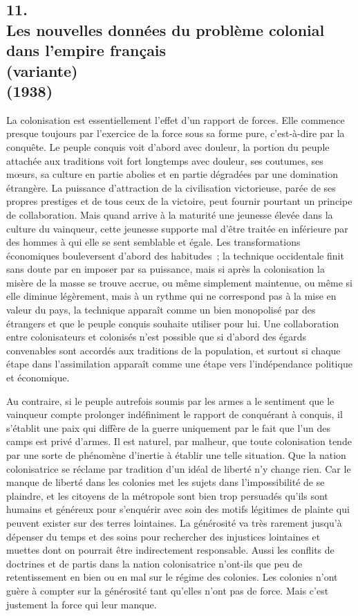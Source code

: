\documentclass[french,twoside]{book} %
\begin{document}
\subsection[11. Les nouvelles données du problème colonial dans l'empire français, (variante) (1938)]{11. \\
Les nouvelles données du problème colonial dans l'empire français \\
(variante) \\
(1938)}
\noindent \par
La colonisation est essentiellement l'effet d'un rapport de forces. Elle commence presque toujours par l'exercice de la force sous sa forme pure, c'est-à-dire par la conquête. Le peuple conquis voit d'abord avec douleur, la portion du peuple attachée aux traditions voit fort longtemps avec douleur, ses coutumes, ses mœurs, sa culture en partie abolies et en partie dégradées par une domination étrangère. La puissance d'attraction de la civilisation victo­rieuse, parée de ses propres prestiges et de tous ceux de la victoire, peut fournir pourtant un principe de collaboration. Mais quand arrive à la maturité une jeunesse élevée dans la culture du vainqueur, cette jeunesse supporte mal d'être traitée en inférieure par des hommes à qui elle se sent semblable et égale. Les transformations économiques bouleversent d'abord des habitudes ; la technique occidentale finit sans doute par en imposer par sa puissance, mais si après la colonisation la misère de la masse se trouve accrue, ou même simplement maintenue, ou même si elle diminue légèrement, mais à un rythme qui ne correspond pas à la mise en valeur du pays, la technique apparaît comme un bien monopolisé par des étrangers et que le peuple conquis souhaite utiliser pour lui. Une collaboration entre colonisateurs et colonisés n'est possible que si d'abord des égards convenables sont accordés aux tradi­tions de la population, et surtout si chaque étape dans l'assimilation apparaît comme une étape vers l'indépendance politique et économique.\par
Au contraire, si le peuple autrefois soumis par les armes a le sentiment que le vainqueur compte prolonger indéfiniment le rapport de conquérant à conquis, il s'établit une paix qui diffère de la guerre uniquement par le fait que l'un des camps est privé d'armes. Il est naturel, par malheur, que toute colonisation tende par une sorte de phénomène d'inertie à établir une telle situation. Que la nation colonisatrice se réclame par tradition d'un idéal de liberté n'y change rien. Car le manque de liberté dans les colonies met les sujets dans l'impossibilité de se plaindre, et les citoyens de la métropole sont bien trop persuadés qu'ils sont humains et généreux pour s'enquérir avec soin des motifs légitimes de plainte qui peuvent exister sur des terres lointaines. La générosité va très rarement jusqu'à dépenser du temps et des soins pour rechercher des injustices lointaines et muettes dont on pourrait être indirec­tement responsable. Aussi les conflits de doctrines et de partis dans la nation colonisatrice n'ont-ils que peu de retentissement en bien ou en mal sur le régime des colonies. Les colonies n'ont guère à compter sur la générosité tant qu'elles n'ont pas de force. Mais c'est justement la force qui leur manque.
\end{document}

